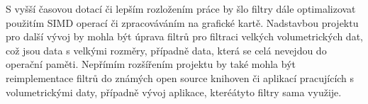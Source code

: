 S vyšší časovou dotací či lepším rozložením práce by šlo filtry dále optimalizovat použitím SIMD operací či zpracováváním na grafické kartě. Nadstavbou projektu pro další vývoj by mohla být úprava filtrů pro filtraci velkých volumetrických dat, což jsou data s velkými rozměry, případně data, která se celá nevejdou do operační paměti.
Nepřímím rozšířením projektu by také mohla být reimplementace filtrů do známých open source knihoven či aplikací pracujících s volumetrickými daty, případně vývoj aplikace, kteréátyto filtry sama využije. 